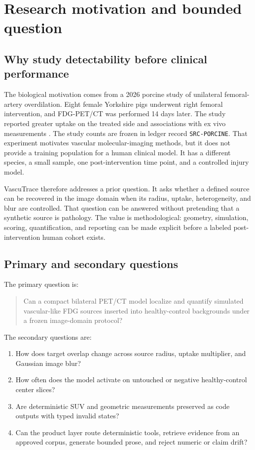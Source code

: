 \documentclass[11pt]{article}
\newcommand{\evidenceid}[1]{\texttt{#1}}
\begin{document}
\section{Research motivation and bounded question}

\subsection{Why study detectability before clinical performance}

The biological motivation comes from a 2026 porcine study of unilateral femoral-artery overdilation. Eight female Yorkshire pigs underwent right femoral intervention, and FDG-PET/CT was performed 14 days later. The study reported greater uptake on the treated side and associations with ex vivo measurements \citep{porcine2026}. The study counts are frozen in ledger record \evidenceid{SRC-PORCINE}. That experiment motivates vascular molecular-imaging methods, but it does not provide a training population for a human clinical model. It has a different species, a small sample, one post-intervention time point, and a controlled injury model.

VascuTrace therefore addresses a prior question. It asks whether a defined source can be recovered in the image domain when its radius, uptake, heterogeneity, and blur are controlled. That question can be answered without pretending that a synthetic source is pathology. The value is methodological: geometry, simulation, scoring, quantification, and reporting can be made explicit before a labeled post-intervention human cohort exists.

\subsection{Primary and secondary questions}

The primary question is:

\begin{quote}
Can a compact bilateral PET/CT model localize and quantify simulated vascular-like FDG sources inserted into healthy-control backgrounds under a frozen image-domain protocol?
\end{quote}

The secondary questions are:

\begin{enumerate}
  \item How does target overlap change across source radius, uptake multiplier, and Gaussian image blur?
  \item How often does the model activate on untouched or negative healthy-control center slices?
  \item Are deterministic SUV and geometric measurements preserved as code outputs with typed invalid states?
  \item Can the product layer route deterministic tools, retrieve evidence from an approved corpus, generate bounded prose, and reject numeric or claim drift?
\end{enumerate}
\end{document}
